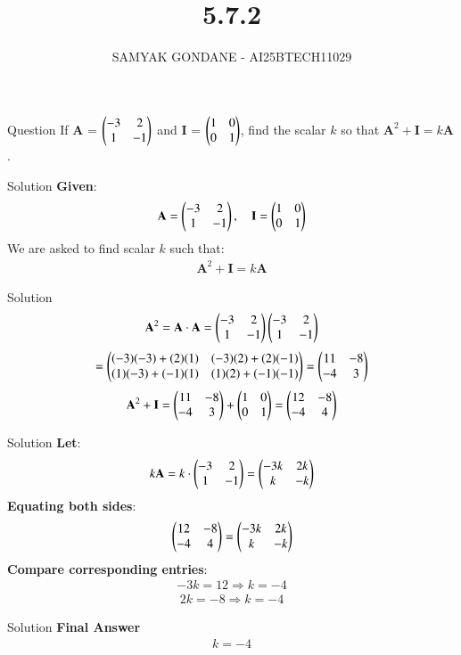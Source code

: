\documentclass{beamer}
\title 
{5.7.2}
\date{}
\author
{SAMYAK GONDANE - AI25BTECH11029}
\begin{document}
\frame{\titlepage}

\begin{frame}{Question}
If $\textbf{A}$ = $\begin{pmatrix}-3 & 2 \\ 1 & -1\end{pmatrix}$ and $\textbf{I}$ = $\begin{pmatrix}1 & 0 \\ 0 & 1\end{pmatrix}$, find the scalar $k$ so that $\textbf{A}^2 + \textbf{I} = k\textbf{A}$.
\end{frame}

\begin{frame}{Solution}
\textbf{Given}:
\begin{align}
\textbf{A} = \begin{pmatrix}-3 & 2 \\ 1 & -1\end{pmatrix}, \quad
\textbf{I} = \begin{pmatrix}1 & 0 \\ 0 & 1\end{pmatrix}
\end{align}
We are asked to find scalar $k$ such that:
\begin{align}
\textbf{A}^2 + \textbf{I} = k\textbf{A}
\end{align}
\end{frame}


\begin{frame}{Solution}
\begin{align}
\textbf{A}^2 = \textbf{A} \cdot \textbf{A} = 
\begin{pmatrix}-3 & 2 \\ 1 & -1\end{pmatrix}
\begin{pmatrix}-3 & 2 \\ 1 & -1\end{pmatrix}
\end{align}
\begin{align}
= \begin{pmatrix}(-3)(-3) + (2)(1) & (-3)(2) + (2)(-1) \\
(1)(-3) + (-1)(1) & (1)(2) + (-1)(-1)\end{pmatrix}
= \begin{pmatrix}11 & -8 \\ -4 & 3\end{pmatrix}
\end{align}
\begin{align}
\textbf{A}^2 + \textbf{I} = \begin{pmatrix}11 & -8 \\ -4 & 3\end{pmatrix} + \begin{pmatrix}1 & 0 \\ 0 & 1\end{pmatrix} = \begin{pmatrix}12 & -8 \\ -4 & 4\end{pmatrix}
\end{align}
\end{frame}


\begin{frame}{Solution}
\textbf{Let}:
\begin{align}
k\textbf{A} = k \cdot \begin{pmatrix}-3 & 2 \\ 1 & -1\end{pmatrix} = \begin{pmatrix}-3k & 2k \\ k & -k\end{pmatrix}
\end{align}
\textbf{Equating both sides}:
\begin{align}
\begin{pmatrix}12 & -8 \\ -4 & 4\end{pmatrix} = \begin{pmatrix}-3k & 2k \\ k & -k\end{pmatrix}
\end{align}
\textbf{Compare corresponding entries}:
\begin{align}
-3k = 12 \Rightarrow k = -4
\end{align}
\begin{align}
2k = -8 \Rightarrow k = -4
\end{align}
\end{frame}


\begin{frame}{Solution}
\textbf{Final Answer}
\begin{align}
\boxed{k = -4}
\end{align}
\end{frame}
\end{document}
